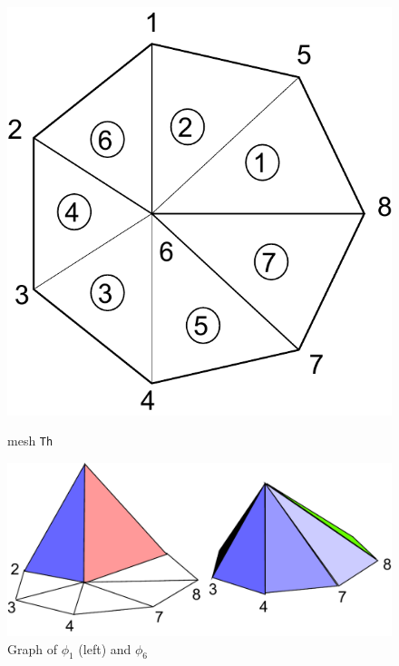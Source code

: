 \documentclass[a4paper,twoside,12pt]{book}
\begin{document}
\begin{figure}[htbp]
\begin{minipage}{\textwidth}
\begin{minipage}{0.3\textwidth}
\includegraphics[width=\textwidth]{secondT}%
\caption{mesh \texttt{Th}}
\end{minipage}
\hspace{0.5mm}
\begin{minipage}{0.7\textwidth}
\includegraphics[width=\textwidth]{hat}%
\caption{Graph of $\phi_1$ (left) and $\phi_6$ \label{fig-hatFunction}}
\end{minipage}
\end{minipage}
\end{figure}
\end{document}
